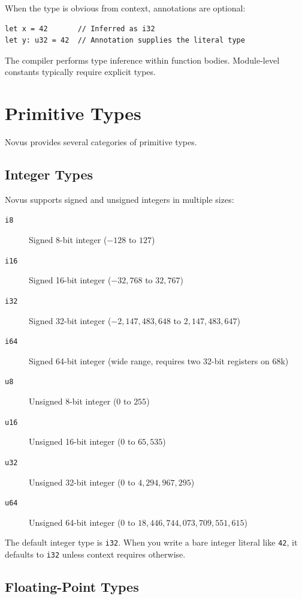 When the type is obvious from context, annotations are optional:

\begin{lstlisting}
let x = 42       // Inferred as i32
let y: u32 = 42  // Annotation supplies the literal type
\end{lstlisting}

The compiler performs type inference within function bodies. Module-level constants typically require explicit types.

\section{Primitive Types}

Novus provides several categories of primitive types.

\subsection{Integer Types}

Novus supports signed and unsigned integers in multiple sizes:

\begin{description}
    \item[\texttt{i8}] Signed 8-bit integer ($-128$ to $127$)
    \item[\texttt{i16}] Signed 16-bit integer ($-32{,}768$ to $32{,}767$)
    \item[\texttt{i32}] Signed 32-bit integer ($-2{,}147{,}483{,}648$ to $2{,}147{,}483{,}647$)
    \item[\texttt{i64}] Signed 64-bit integer (wide range, requires two 32-bit registers on 68k)
    \item[\texttt{u8}] Unsigned 8-bit integer ($0$ to $255$)
    \item[\texttt{u16}] Unsigned 16-bit integer ($0$ to $65{,}535$)
    \item[\texttt{u32}] Unsigned 32-bit integer ($0$ to $4{,}294{,}967{,}295$)
    \item[\texttt{u64}] Unsigned 64-bit integer ($0$ to $18{,}446{,}744{,}073{,}709{,}551{,}615$)
\end{description}

The default integer type is \texttt{i32}. When you write a bare integer literal like \texttt{42}, it defaults to \texttt{i32} unless context requires otherwise.

\subsection{Floating-Point Types}

